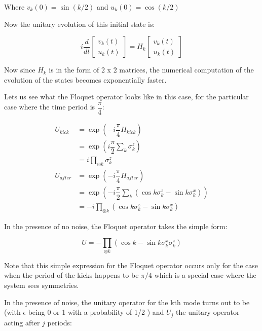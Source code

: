 \documentclass[11pt,a4paper]{article}
\begin{document}
		Where $ v_{k}(0) = \sin(k/2) $ and $ u_{k}(0) = \cos(k/2) $
		
		Now the unitary evolution of this initial state is: 
		
		\begin{equation}\label{key}
		i \dfrac{d}{dt} \begin{bmatrix}
		v_{k}(t)\\u_{k}(t)
		\end{bmatrix} =  H_{k}\begin{bmatrix}
			v_{k}(t)\\u_{k}(t)
		\end{bmatrix}
		\end{equation}
		
		Now since $ H_{k} $ is in the form of  2 x 2  matrices, the numerical computation of the evolution of the states becomes exponentially faster. 
 		
 		Lets us see what the Floquet operator looks like in this case, for the particular case where the time period is $ \dfrac{\pi}{4} $: 
 		
 			\begin{align}
 		U_{kick}& = \exp(-i \dfrac{\pi}{4} H_{kick})\\
 		& = \exp(i \dfrac{\pi}{2} \sum_{k}\sigma_{k}^z)\\
 		& = i\prod_{\otimes k} \sigma_{k}^z\\
 		U_{after} & = \exp(-i\dfrac{\pi}{4}H_{after})\\
 		&= \exp(-i\dfrac{\pi}{2}\sum_{k} (\cos k \sigma_{k}^z - \sin k \sigma_{k}^x ))\\
 		& = -i \prod_{\otimes k} (\cos k \sigma_{k}^z - \sin k \sigma_{k}^x )
 		\end{align}
 		
 	In the presence of no noise, the Floquet operator takes the simple form: 
 	
 	\begin{equation}\label{key}
 	U = - \prod_{\otimes k} (\cos k - \sin k \sigma_{k}^x \sigma_{k}^z)
  	\end{equation}
  	
  	Note that this simple expression for the Floquet operator occurs only for the case when the period of the kicks happens to be $ \pi/4 $ which is a special case where the system sees symmetries. 
  	
  	
  	In the presence of noise, the unitary operator for the kth mode  turns out to be (with $ \epsilon $ being 0 or 1 with a probability of 1/2 ) and $ U_{j} $  the unitary operator acting after $ j $ periods\cite{PhysRevB.98.064305}: 
  	
\end{document}
